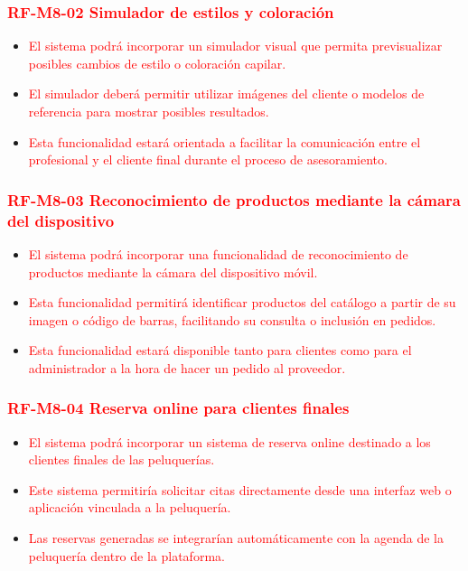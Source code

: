 \vspace{-0.75em}
\subsubsection{\textcolor{red}{RF-M8-02 Simulador de estilos y coloración}}
\vspace{-1em}

\begin{itemize}
    \item \textcolor{red}{El sistema podrá incorporar un simulador visual que permita previsualizar posibles cambios de estilo o coloración capilar.}
    \item \textcolor{red}{El simulador deberá permitir utilizar imágenes del cliente o modelos de referencia para mostrar posibles resultados.}
    \item \textcolor{red}{Esta funcionalidad estará orientada a facilitar la comunicación entre el profesional y el cliente final durante el proceso de asesoramiento.}
\end{itemize}

\vspace{-0.75em}
\subsubsection{\textcolor{red}{RF-M8-03 Reconocimiento de productos mediante la cámara del dispositivo}}
\vspace{-1em}

\begin{itemize}
    \item \textcolor{red}{El sistema podrá incorporar una funcionalidad de reconocimiento de productos mediante la cámara del dispositivo móvil.}
    \item \textcolor{red}{Esta funcionalidad permitirá identificar productos del catálogo a partir de su imagen o código de barras, facilitando su consulta o inclusión en pedidos.}
    \item \textcolor{red}{Esta funcionalidad estará disponible tanto para clientes como para el administrador a la hora de hacer un pedido al proveedor.}
\end{itemize}


\vspace{-0.75em}
\subsubsection{\textcolor{red}{RF-M8-04 Reserva online para clientes finales}}
\vspace{-1em}

\begin{itemize}
    \item \textcolor{red}{El sistema podrá incorporar un sistema de reserva online destinado a los clientes finales de las peluquerías.}
    \item \textcolor{red}{Este sistema permitiría solicitar citas directamente desde una interfaz web o aplicación vinculada a la peluquería.}
    \item \textcolor{red}{Las reservas generadas se integrarían automáticamente con la agenda de la peluquería dentro de la plataforma.}
\end{itemize}
